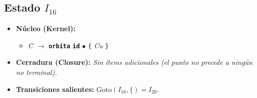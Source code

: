 \documentclass[12pt, letterpaper]{article}
\begin{document}
\subsection*{Estado $I_{16}$ }
\begin{itemize}\setlength{\itemsep}{1pt}\setlength{\parskip}{0pt}
\item \textbf{Núcleo (Kernel):}
\begin{itemize}\setlength{\itemsep}{1pt}\setlength{\parskip}{0pt}
    \item \textit{C} $\to$ \textbf{\texttt{orbita}} \textbf{\texttt{id}} $\bullet$ \texttt{\{} \textit{Cu} \texttt{\}}
\end{itemize}
\item \textbf{Cerradura (Closure):} \emph{Sin ítems adicionales (el punto no precede a ningún no terminal).}
\item \textbf{Transiciones salientes:} $\text{Goto}(I_{16}, \texttt{\{}) = I_{20}$.
\end{itemize}
\vspace{2pt}
\end{document}
